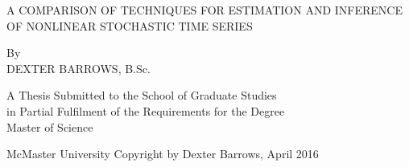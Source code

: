 \newpage
\thispagestyle{empty}
\centering
\null

\vfill

\uppercase{A Comparison of Techniques for Estimation and Inference of Nonlinear Stochastic Time Series}

\vspace{3cm}

By \\
\uppercase{Dexter Barrows}, B.Sc.

\vspace{3cm}


A Thesis Submitted to the School of Graduate Studies \\
in Partial Fulfilment of the Requirements for the Degree\\
Master of Science

\vspace{2cm}

McMaster University \textcopyright Copyright by Dexter Barrows, April 2016

\vfill